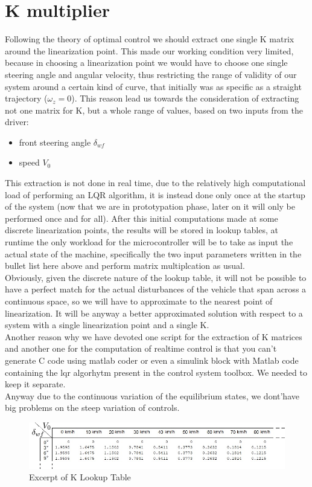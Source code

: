 \section{K multiplier}
Following the theory of optimal control we should extract one single K matrix around the linearization point. This made our working condition very limited, because in choosing a linearization point we would have to choose one single steering angle and angular velocity, thus restricting the range of validity of our system around a certain kind of curve, that initially was as specific as a straight trajectory ($\omega_{z}=0$).
This reason lead us towards the consideration of extracting not one matrix for K, but a whole range of values, based on two inputs from the driver:
\begin{itemize}
	\item front steering angle $\delta_{wf}$
	\item speed $V_0$
\end{itemize}	
This extraction is not done in real time, due to the relatively high computational load of performing an LQR algorithm, it is instead done only once at the startup of the system (now that we are in prototypation phase, later on it will only be performed once and for all). After this initial computations made at some discrete linearization points, the results will be stored in lookup tables, at runtime the only workload for the microcontroller will be to take as input the actual state of the machine, specifically the two input parameters written in the bullet list here above and perform matrix multiplcation as usual.\\
Obviously, given the discrete nature of the lookup table, it will not be possible to have a perfect match for the actual disturbances of the vehicle that span across a continuous space, so we will have to approximate to the nearest point of linearization. It will be anyway a better approximated solution with respect to a system with a single linearization point and a single K.\\
Another reason why we have devoted one script for the extraction of K matrices and another one for the computation of realtime control is that you can't generate C code using matlab coder or even a simulink block with Matlab code containing the lqr algorhytm present in the control system toolbox. We needed to keep it separate.\\
Anyway due to the continuous variation of the equilibrium states, we dont'have big problems on the steep variation of controls.
\begin{figure}[!h]
\includegraphics[width=\linewidth]{../Images/KLut.jpg}\caption{Excerpt of K Lookup Table}
\end{figure}
